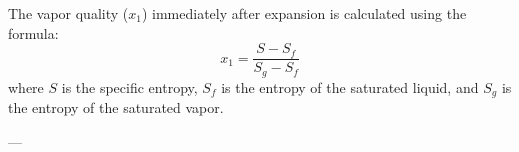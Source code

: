 The vapor quality (\(x_1\)) immediately after expansion is calculated using the formula:  
\[
x_1 = \frac{S - S_f}{S_g - S_f}
\]  
where \(S\) is the specific entropy, \(S_f\) is the entropy of the saturated liquid, and \(S_g\) is the entropy of the saturated vapor.

---